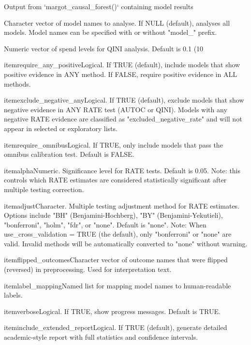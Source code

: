 \documentclass[a4paper]{book}
\begin{document}
\begin{Arguments}
\begin{ldescription}
\item[\code{models}] Output from `margot\_causal\_forest()` containing model results

\item[\code{model\_names}] Character vector of model names to analyse. If NULL (default), 
analyses all models. Model names can be specified with or without "model\_" prefix.

\item[\code{spend\_levels}] Numeric vector of spend levels for QINI analysis. 
Default is 0.1 (10

\bsl{}itemrequire\_any\_positiveLogical. If TRUE (default), include models that 
show positive evidence in ANY method. If FALSE, require positive evidence 
in ALL methods.

\bsl{}itemexclude\_negative\_anyLogical. If TRUE (default), exclude models that 
show negative evidence in ANY RATE test (AUTOC or QINI). Models with any 
negative RATE evidence are classified as "excluded\_negative\_rate" and will 
not appear in selected or exploratory lists.

\bsl{}itemrequire\_omnibusLogical. If TRUE, only include models that pass the 
omnibus calibration test. Default is FALSE.

\bsl{}itemalphaNumeric. Significance level for RATE tests. Default is 0.05.
Note: this controls which RATE estimates are considered statistically significant after
multiple testing correction.

\bsl{}itemadjustCharacter. Multiple testing adjustment method for RATE estimates. 
Options include "BH" (Benjamini-Hochberg), "BY" (Benjamini-Yekutieli), 
"bonferroni", "holm", "fdr", or "none". Default is "none".
Note: When use\_cross\_validation = TRUE (the default), only "bonferroni" or "none" are valid.
Invalid methods will be automatically converted to "none" without warning.

\bsl{}itemflipped\_outcomesCharacter vector of outcome names that were flipped 
(reversed) in preprocessing. Used for interpretation text.

\bsl{}itemlabel\_mappingNamed list for mapping model names to human-readable labels.

\bsl{}itemverboseLogical. If TRUE, show progress messages. Default is TRUE.

\bsl{}iteminclude\_extended\_reportLogical. If TRUE (default), generate detailed academic-style report
with full statistics and confidence intervals.


\end{ldescription}
\end{Arguments}
\end{document}
